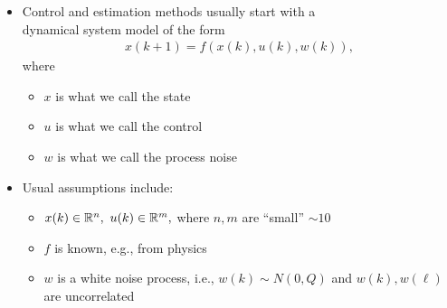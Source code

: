 \documentclass[aspectratio=169,handout]{beamer} 	%
\begin{document}




\begin{frame}
	\frametitle{}
	\begin{itemize}[<+->]
		\itemsep\baselineskip
		\item Control and estimation methods usually start with a \\ dynamical system 
		model of the form
		\begin{align*}
			x(k + 1) = f( x(k), u(k), w(k) ),
		\end{align*}
		where%
		\begin{itemize}
			\item $x$ is what we call the \alert{state}
			\item $u$ is what we call the \alert{control}
			\item $w$ is what we call the \alert{process noise}
		\end{itemize}
	
		\item Usual assumptions include:
		\begin{itemize}
			\item $x(k) \in \real[n], ~u(k) \in \real[m],$  where $n,m$ are ``small'' $\sim 10$
			\item $f$ is known, e.g., from physics
			\item $w$ is a white noise process, i.e., $w(k) \sim N(0, Q)$ and $w(k), w(\ell)$
			are uncorrelated
		\end{itemize}

	\end{itemize}
	
\end{frame}
\end{document}
